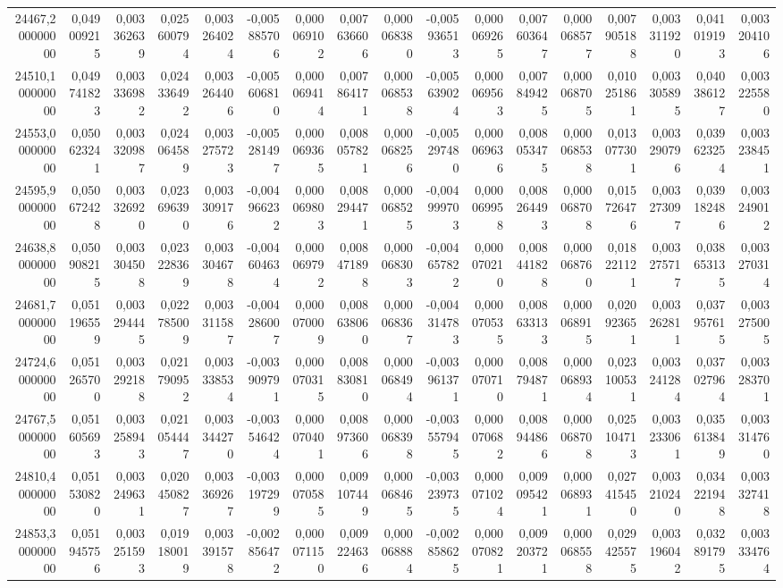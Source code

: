 \begin{longtable}{rrrrrrrrrrrrrrrrr}
24467,200000000 & 0,049009215 & 0,003362639 & 0,025600794 & 0,003264024 & -0,005885706 & 0,000069102 & 0,007636606 & 0,000068380 & -0,005936513 & 0,000069265 & 0,007603647 & 0,000068577 & 0,007905188 & 0,003311920 & 0,041019193 & 0,003204106\\
24510,100000000 & 0,049741823 & 0,003336982 & 0,024336492 & 0,003264406 & -0,005606810 & 0,000069414 & 0,007864171 & 0,000068538 & -0,005639024 & 0,000069563 & 0,007849425 & 0,000068705 & 0,010251861 & 0,003305895 & 0,040386127 & 0,003225580\\
24553,000000000 & 0,050623241 & 0,003320987 & 0,024064589 & 0,003275723 & -0,005281497 & 0,000069365 & 0,008057821 & 0,000068256 & -0,005297480 & 0,000069636 & 0,008053475 & 0,000068538 & 0,013077301 & 0,003290796 & 0,039623254 & 0,003238451\\
24595,900000000 & 0,050672428 & 0,003326920 & 0,023696390 & 0,003309176 & -0,004966232 & 0,000069803 & 0,008294471 & 0,000068525 & -0,004999703 & 0,000069958 & 0,008264493 & 0,000068708 & 0,015726476 & 0,003273097 & 0,039182486 & 0,003249012\\
24638,800000000 & 0,050908215 & 0,003304508 & 0,023228369 & 0,003304678 & -0,004604634 & 0,000069792 & 0,008471898 & 0,000068303 & -0,004657822 & 0,000070210 & 0,008441828 & 0,000068760 & 0,018221121 & 0,003275717 & 0,038653135 & 0,003270314\\
24681,700000000 & 0,051196559 & 0,003294445 & 0,022785009 & 0,003311587 & -0,004286007 & 0,000070009 & 0,008638060 & 0,000068367 & -0,004314783 & 0,000070535 & 0,008633133 & 0,000068915 & 0,020923651 & 0,003262811 & 0,037957615 & 0,003275005\\
24724,600000000 & 0,051265700 & 0,003292188 & 0,021790952 & 0,003338534 & -0,003909791 & 0,000070315 & 0,008830810 & 0,000068494 & -0,003961371 & 0,000070710 & 0,008794871 & 0,000068934 & 0,023100531 & 0,003241284 & 0,037027964 & 0,003283701\\
24767,500000000 & 0,051605693 & 0,003258943 & 0,021054447 & 0,003344270 & -0,003546424 & 0,000070401 & 0,008973606 & 0,000068398 & -0,003557945 & 0,000070682 & 0,008944866 & 0,000068708 & 0,025104713 & 0,003233061 & 0,035613849 & 0,003314760\\
24810,400000000 & 0,051530820 & 0,003249631 & 0,020450827 & 0,003369267 & -0,003197299 & 0,000070585 & 0,009107449 & 0,000068465 & -0,003239735 & 0,000071024 & 0,009095421 & 0,000068931 & 0,027415450 & 0,003210240 & 0,034221948 & 0,003327418\\
24853,300000000 & 0,051945756 & 0,003251593 & 0,019180019 & 0,003391578 & -0,002856472 & 0,000071150 & 0,009224636 & 0,000068884 & -0,002858625 & 0,000070821 & 0,009203721 & 0,000068558 & 0,029425575 & 0,003196042 & 0,032891795 & 0,003334764\\

\end{longtable}
